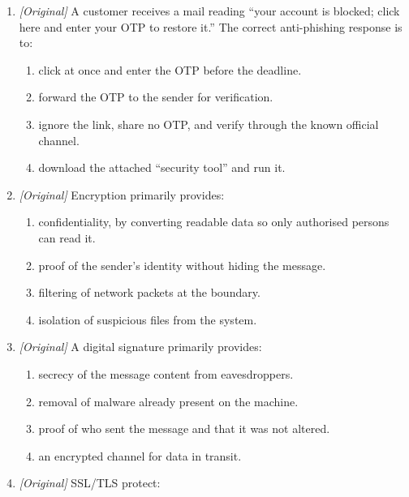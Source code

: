\begin{enumerate}[label=\textbf{Q\arabic*.}, leftmargin=*]
\begin{enumerate}[label=\Alph*.]
    \item a barrier that filters incoming and outgoing network traffic.
    \item a vendor update that fixes known security flaws.
    \item a protocol that encrypts data during transmission.
  \end{enumerate}
\item \textit{[Original]} A customer receives a mail reading ``your account
  is blocked; click here and enter your OTP to restore it.'' The correct
  anti-phishing response is to:
  \begin{enumerate}[label=\Alph*.]
    \item click at once and enter the OTP before the deadline.
    \item forward the OTP to the sender for verification.
    \item ignore the link, share no OTP, and verify through the known official channel.
    \item download the attached ``security tool'' and run it.
  \end{enumerate}
\item \textit{[Original]} Encryption primarily provides:
  \begin{enumerate}[label=\Alph*.]
    \item confidentiality, by converting readable data so only authorised persons can read it.
    \item proof of the sender's identity without hiding the message.
    \item filtering of network packets at the boundary.
    \item isolation of suspicious files from the system.
  \end{enumerate}
\item \textit{[Original]} A digital signature primarily provides:
  \begin{enumerate}[label=\Alph*.]
    \item secrecy of the message content from eavesdroppers.
    \item removal of malware already present on the machine.
    \item proof of who sent the message and that it was not altered.
    \item an encrypted channel for data in transit.
  \end{enumerate}
\item \textit{[Original]} SSL/TLS protect:
  \begin{enumerate}[label=\Alph*.]

\end{enumerate}
\end{enumerate}
